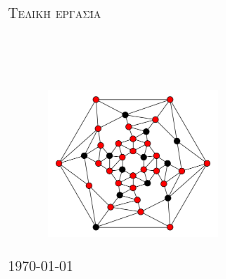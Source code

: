 \documentclass[
11pt, %
oneside, %
greek,
english, %
singlespacing, %
headsepline, %
]{MastersDoctoralThesis} %
\author{Δημήτριος \textsc{Δήμου}} %
\begin{document}
\frontmatter %

\pagestyle{plain} %


\begin{titlepage}
\begin{center}

{\scshape\LARGE \univname\par}\vspace{0.5cm} %
{\scshape\Large \deptname\par}\vspace{1.5cm}
\textsc{\Large Τελική εργασία}\\[0.5cm] %

\HRule \\[0.4cm] %
{\huge \bfseries \ttitle\par}\vspace{0.4cm} %
\HRule \\[1.5cm] %
 
\begin{figure}[H]
\centering
\includegraphics[width=0.4\textwidth]{Figures/vertexcover.png}
\end{figure}

\vfill
\begin{minipage}[t]{0.7\textwidth}
\begin{flushleft} \large
\centerline{\authorname}%
\end{flushleft}
\end{minipage}

{\large \today}\vspace{-10mm} %
 

\end{center}
\end{titlepage}
\end{document}
